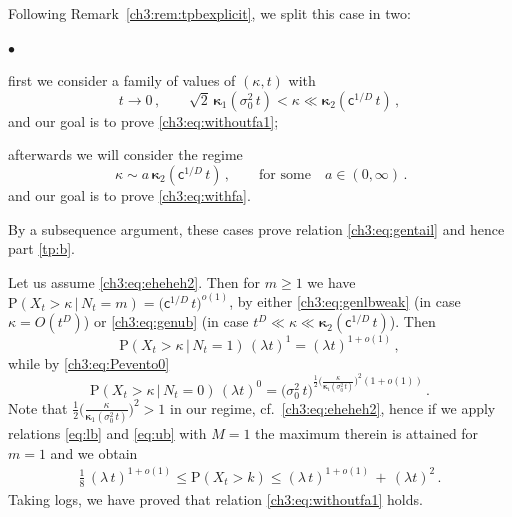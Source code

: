 \documentclass[a4paper,reqno,11pt]{amsart}
\numberwithin{equation}{section}
\newcommand{\PEfont}{\mathrm}
\renewcommand{\P}{\ensuremath{\PEfont P}}
\newcommand\sfc{\mathsf{c}}
\newenvironment{myitemize}{%
\begin{list}{$\bullet$}%
 	{%
	\setlength{\itemsep}{0.4em}%
	\setlength{\topsep}{0.5em}%
	\setlength\leftmargin{2.45em}%
	\setlength\labelwidth{2.05em}%
	\setlength{\labelsep}{0.4em}%
	}%
	}%
{\end{list}}
\renewenvironment{itemize}{
\begin{myitemize}}%
{\end{myitemize}}
\newcommand\bkappa{\boldsymbol{\kappa}}
\begin{document}
Following Remark~\ref{ch3:rem:tpbexplicit}, we split this case in two:
\begin{itemize}
\item first we consider a family of values of $(\kappa,t)$ with
\begin{equation}\label{ch3:eq:eheheh2}
	t \to 0 \,, \qquad \sqrt{2} \, \bkappa_1(\sigma_0^2 \, t) <
	\kappa \ll \bkappa_2( \sfc^{1/D} \, t) \,,
\end{equation}
and our goal is to prove \eqref{ch3:eq:withoutfa1};

\item afterwards we will consider the regime
\begin{equation}\label{ch3:eq:samefam2}
	\,\kappa \sim a\, \bkappa_2( \sfc^{1/D} \, t) \,,
	\qquad \text{for some} \quad a \in (0,\infty) \,.
\end{equation}
and our goal is to prove \eqref{ch3:eq:withfa}.
\end{itemize}
By a subsequence argument, these cases prove relation \eqref{ch3:eq:gentail}
and hence part \eqref{tp:b}.

\smallskip

Let us assume \eqref{ch3:eq:eheheh2}. Then for $m\ge 1$ we have
$\P(X_t >\kappa \,|\, N_t=m) = \big( \sfc^{1/D} \, t \big)^{o(1)}$,
by either \eqref{ch3:eq:genlbweak} (in case $\kappa = O(t^D)$)
or \eqref{ch3:eq:genub} (in case $t^D \ll \kappa \ll \bkappa_2(\sfc^{1/D} \, t)$). Then
\begin{equation*}
	\P(X_t >\kappa \,|\, N_t=1) \, (\lambda t)^1 = (\lambda t)^{1+o(1)} \,,
\end{equation*}
while by \eqref{ch3:eq:Pevento0}
\begin{equation*}
	\P(X_t >\kappa \,|\, N_t=0) \, (\lambda t)^0 = 
	\big( \sigma_0^2 \, t \big)^{ \frac{1}{2} \big(\frac{\kappa}
	{\bkappa_1(\sigma_0^2\, t)} \big)^2(1+o(1)) } \,.
\end{equation*}
Note that $\frac{1}{2} \big(\frac{\kappa}{\bkappa_1(\sigma_0^2\, t)} \big)^2 > 1$
in our regime, cf.\ \eqref{ch3:eq:eheheh2}, hence if we apply
relations \eqref{eq:lb} and \eqref{eq:ub}
with $M=1$ the maximum therein is attained for $m=1$ and we obtain
\begin{equation*}
\begin{split}
	\frac{1}{8} \, (\lambda \, t )^{1+o(1)}
	\le \P(X_t > k) \le (\lambda \, t )^{1+o(1)}
	\,+\, (\lambda t)^2 \,.
\end{split}
\end{equation*}
Taking logs, we have proved that relation \eqref{ch3:eq:withoutfa1} holds.
\end{document}
